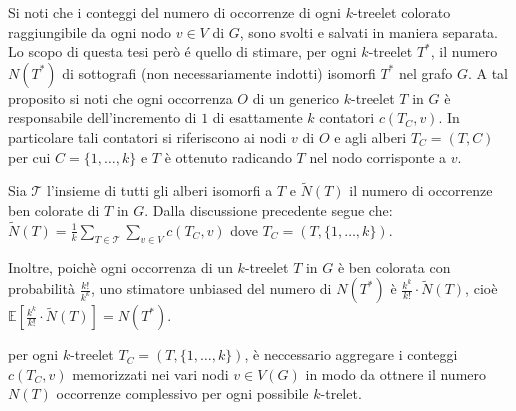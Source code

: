 

Si noti che i conteggi del numero di occorrenze di ogni $ k $-treelet colorato raggiungibile da ogni nodo $ v\in V $ di $ G $, %
sono svolti e salvati in maniera separata.
Lo scopo di questa tesi per\`o \'e quello di stimare, per ogni $k$-treelet $T^*$, il numero $N(T^*)$ di  sottografi (non necessariamente indotti) isomorfi $T^*$ nel grafo $ G $.
A tal proposito si noti che ogni occorrenza $O$ di un generico $k$-treelet $T$ in $G$ è responsabile dell'incremento di $1$ di esattamente $k$ contatori $c(T_C, v)$. In particolare tali contatori si riferiscono ai nodi $v$ di $O$ e agli alberi $T_C = (T,C)$ per cui $C = \{1, \dots, k\} $ e $T$ è ottenuto radicando $T$ nel nodo corrisponte a $v$.

Sia $\mathcal{T}$ l'insieme di tutti gli alberi isomorfi a $T$ e $\widetilde{N}(T)$ il numero di occorrenze ben colorate di $T$ in $G$. Dalla discussione precedente segue che:
$\widetilde{N}(T) = \frac{1}{k}\sum_{T \in \mathcal{T}} \sum_{v \in V} c( T_C, v)$ dove $T_C = (T, \{1,\dots, k\})$. 

Inoltre, poich\`e ogni occorrenza di un $k$-treelet $T$ in $G$ è ben colorata con probabilità $\frac{k!}{k^k}$, uno stimatore unbiased del numero di $N(T^*)$ è $\frac{k^k}{k!} \cdot \widetilde{N}(T)$, cioè
$\mathbb{E}\left[\frac{k^k}{k!} \cdot \widetilde{N}(T)\right] = N(T^*)$.







 per ogni $k$-treelet $T_C = (T, \{1, \dots, k\})$, 
è neccessario aggregare i conteggi $c(T_C, v)$ memorizzati nei vari nodi $v \in V(G)$ in modo da ottnere il numero $N(T)$ occorrenze complessivo per ogni possibile $ k $-trelet.

